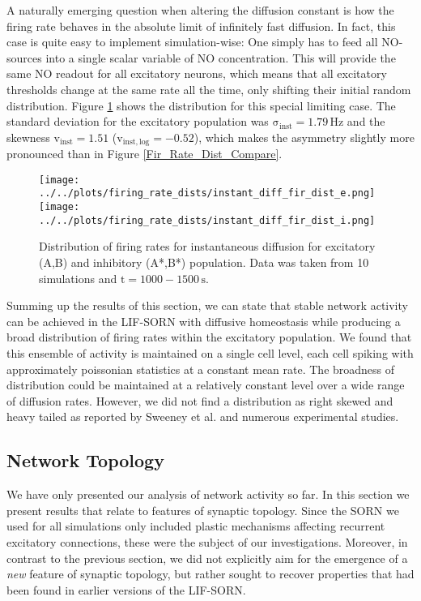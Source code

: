 \documentclass[10pt,a4paper]{article}
\begin{document}
A naturally emerging question when altering the diffusion constant is how the firing rate behaves in the absolute limit of infinitely fast diffusion. In fact, this case is quite easy to implement simulation-wise: One simply has to feed all NO-sources into a single scalar variable of NO concentration. This will provide the same NO readout for all excitatory neurons, which means that all excitatory thresholds change at the same rate all the time, only shifting their initial random distribution. Figure \ref{Fir_Rate_Dist_Instant_compare} shows the distribution for this special limiting case. The standard deviation for the excitatory population was $\mathrm{\sigma_{inst} = 1.79\, Hz}$ and the skewness $\mathrm{v_{inst} = 1.51}$ ($\mathrm{v_{inst,log} = -0.52}$), which makes the asymmetry slightly more pronounced than in Figure \ref{Fir_Rate_Dist_Compare}.  
\begin{figure}
\texttt{[image: ../../plots/firing\_rate\_dists/instant\_diff\_fir\_dist\_e.png]}
\texttt{[image: ../../plots/firing\_rate\_dists/instant\_diff\_fir\_dist\_i.png]}
\caption{Distribution of firing rates for instantaneous diffusion for excitatory (A,B) and inhibitory (A*,B*) population. Data was taken from 10 simulations and $\mathrm{t=1000-1500\,s}$.}
\label{Fir_Rate_Dist_Instant_compare}
\end{figure}

Summing up the results of this section, we can state that stable network activity can be achieved in the LIF-SORN with diffusive homeostasis while producing a broad distribution of firing rates within the excitatory population. We found that this ensemble of activity is maintained on a single cell level, each cell spiking with approximately poissonian statistics at a constant mean rate. The broadness of distribution could be maintained at a relatively constant level over a wide range of diffusion rates. However, we did not find a distribution as right skewed and heavy tailed as reported by Sweeney et al. and numerous experimental studies.

\subsection{Network Topology}\label{Network_Topology_Section}
We have only presented our analysis of network activity so far. In this section we present results that relate to features of synaptic topology. Since the SORN we used for all simulations only included plastic mechanisms affecting recurrent excitatory connections, these were the subject of our investigations. Moreover, in contrast to the previous section, we did not explicitly aim for the emergence of a \emph{new} feature of synaptic topology, but rather sought to recover properties that had been found in earlier versions of the LIF-SORN.
\end{document}
